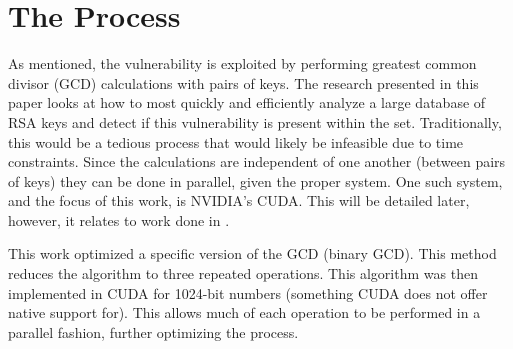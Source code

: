 \documentclass[12pt]{ucthesis}
\begin{document}
\section{The Process}
As mentioned, the vulnerability is exploited by performing greatest common
divisor (GCD) calculations with pairs of keys. The research presented in this
paper looks at how to most quickly and efficiently analyze a large database of
RSA keys and detect if this vulnerability is present within the set.
Traditionally, this would be a tedious process that would likely be infeasible
due to time constraints. Since the calculations are independent of one another
(between pairs of keys) they can be done in parallel, given the proper system.
One such system, and the focus of this work, is NVIDIA's CUDA. This will be
detailed later, however, it relates to work done in \cite{fujimoto2009high}. 

This work optimized a specific version of the GCD (binary GCD). This method
reduces the algorithm to three repeated operations. This algorithm was then
implemented in CUDA for 1024-bit numbers (something CUDA does not offer native
support for). This allows much of each operation to be performed in a parallel
fashion, further optimizing the process.

%
%
%
\end{document}
